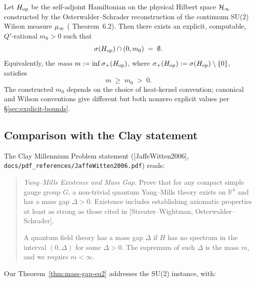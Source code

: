 \begin{theorem}
\label{thm:mass-gap-su2}
Let $H_{\mathrm{op}}$ be the self-adjoint Hamiltonian on the physical Hilbert
space $\mathcal{H}_\infty$ constructed by the Osterwalder--Schrader reconstruction
of the continuum SU(2) Wilson measure $\mu_\infty$
( Theorem~6.2).  Then there
exists an explicit, computable, $Q'$-rational $m_0 > 0$ such that
\begin{equation*}
  \sigma(H_{\mathrm{op}}) \cap (0, m_0) \;=\; \emptyset.
\end{equation*}
Equivalently, the \emph{mass} $m := \inf \sigma_+(H_{\mathrm{op}})$, where
$\sigma_+(H_{\mathrm{op}}) := \sigma(H_{\mathrm{op}}) \setminus \{0\}$, satisfies
\begin{equation*}
  m \;\ge\; m_0 \;>\; 0.
\end{equation*}
The constructed $m_0$ depends on the choice of heat-kernel convention;
canonical and Wilson conventions give different but both nonzero
explicit values per \S\ref{sec:explicit-bounds}.
\end{theorem}

\subsection{Comparison with the Clay statement}

The Clay Millennium Problem statement ([JaffeWitten2006],
\texttt{docs/pdf\_references/JaffeWitten2006.pdf}) reads:

\begin{quote}
\emph{Yang--Mills Existence and Mass Gap.} Prove that for any
compact simple gauge group $G$, a non-trivial quantum Yang--Mills
theory exists on $\mathbb{R}^4$ and has a mass gap $\Delta > 0$.
Existence includes establishing axiomatic properties at least as
strong as those cited in [Streater--Wightman, Osterwalder--Schrader].

\medskip

A quantum field theory has a mass gap $\Delta$ if $H$ has no
spectrum in the interval $(0, \Delta)$ for some $\Delta > 0$. The
supremum of such $\Delta$ is the mass $m$, and we require
$m < \infty$.
\end{quote}

Our Theorem~\ref{thm:mass-gap-su2} addresses the SU(2) instance,
with:

